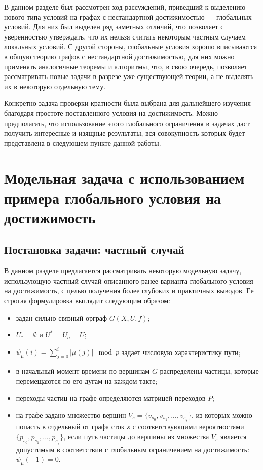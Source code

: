 В данном разделе был рассмотрен ход рассуждений, приведший к выделению нового типа условий на графах с нестандартной достижимостью --- глобальных условий. Для них был выделен ряд заметных отличий, что позволяет с уверенностью утверждать, что их нельзя считать некоторым частным случаем локальных условий. С другой стороны, глобальные условия хорошо вписываются в общую теорию графов с нестандартной достижимостью, для них можно применять аналогичные теоремы и алгоритмы, что, в свою очередь, позволяет рассматривать новые задачи в разрезе уже существующей теории, а не выделять их в некоторую отдельную тему. 

Конкретно задача проверки кратности была выбрана для дальнейшего изучения благодаря простоте поставленного условия на достижимость. Можно предполагать, что использование этого глобального ограничения в задачах даст получить интересные и изящные результаты, вся совокупность которых будет представлена в следующем пункте данной работы. 

\chapter{Модельная задача с использованием примера глобального условия на достижимость}

\section{Постановка задачи: частный случай}

В данном разделе предлагается рассматривать некоторую модельную задачу, использующую частный случай описанного ранее варианта глобального условия на достижимость, с целью получения более глубоких и практичных выводов. Ее строгая формулировка выглядит следующим образом:

\begin{itemize}
	\item задан сильно связный орграф $G(X,U,f)$;
	\item $U_* = \emptyset$ и $U^* = U_o = U$;
	\item $\psi_\mu(i) = \sum_{j=0}^i | \mu(j)|\mod p$ задает числовую характеристику пути; 
	\item в начальный момент времени по вершинам $G$ распределены частицы, которые перемещаются по его дугам на каждом такте;
	\item переходы частиц на графе определяются матрицей переходов $P$;
	\item на графе задано множество вершин $V_s = \{v_{s_0}, v_{s_1}, ... , v_{s_q}\}$, из которых можно попасть в отдельный от графа сток $s$ с соответствующими вероятностями $\{p_{s_0}, p_{s_1}, ... , p_{s_q}\}$, если путь частицы до вершины из множества $V_s$ является допустимым в соответствии с глобальным ограничением на достижимость: $\psi_\mu(-1) = 0$.
\end{itemize}

